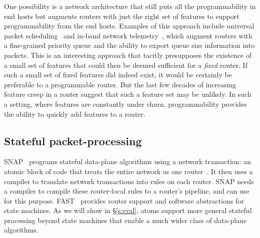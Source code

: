 One possibility is a network architecture that still puts all the
programmability in end hosts but augments routers with just the right set of
features to support programmability from the end hosts. Examples of this
approach include universal packet scheduling~\cite{ups} and in-band network
telemetry~\cite{int}, which augment routers with a fine-grained priority queue
and the ability to export queue size information into packets. This is an
interesting approach that tacitly presupposes the existence of a small set of
features that could then be deemed sufficient for a {\em fixed} router. If such
a small set of fixed features did indeed exist, it would be certainly be
preferable to a programmable router. But the last few decades of increasing
feature creep in a router suggest that such a feature set may be unlikely. In
such a setting, where features are constantly under churn, programmability
provides the ability to quickly add features to a router.

\subsection{Stateful packet-processing}
SNAP~\cite{snap} programs stateful data-plane algorithms using a network
transaction: an atomic block of code that treats the entire network as one
router~\cite{onebigswitch}. It then uses a compiler to translate network
transactions into rules on each router. SNAP needs a compiler to compile these
router-local rules to a router's pipeline, and can use \pktlanguage for this
purpose. FAST~\cite{fast} provides router support and software abstractions for
state machines. As we will show in \S\ref{s:eval}, atoms support more general
stateful processing beyond state machines that enable a much wider class of
data-plane algorithms.

